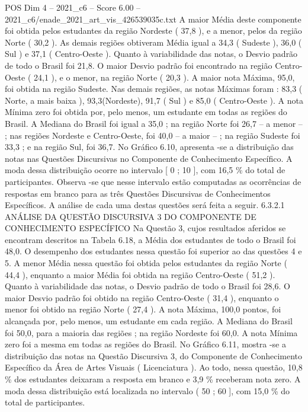 \begin{textsample}{POS Dim 4 – 2021\_c6 – Score 6.00 – 2021\_c6/enade\_2021\_art\_vis\_426539035c.txt}
A maior Média deste componente foi obtida pelos estudantes da região Nordeste ( 37,8 ), e a menor, pelos da região Norte ( 30,2 ).
As demais regiões obtiveram Média igual a 34,3 ( Sudeste ), 36,0 ( Sul ) e 37,1 ( Centro-Oeste ).
Quanto à variabilidade das notas, o Desvio padrão de todo o Brasil foi 21,8.
O maior Desvio padrão foi encontrado na região Centro-Oeste ( 24,1 ), e o menor, na região Norte ( 20,3 ).
A maior nota Máxima, 95,0, foi obtida na região Sudeste.
Nas demais regiões, as notas Máximas foram : 83,3 ( Norte, a mais baixa ), 93,3(Nordeste), 91,7 ( Sul ) e 85,0 ( Centro-Oeste ).
A nota Mínima zero foi obtida por, pelo menos, um estudante em todas as regiões do Brasil.
A Mediana do Brasil foi igual a 35,0 ; na região Norte foi 26,7 – a menor – ; nas regiões Nordeste e Centro-Oeste, foi 40,0 – a maior – ; na região Sudeste foi 33,3 ; e na região Sul, foi 36,7.
No Gráfico 6.10, apresenta -se a distribuição das notas nas Questões Discursivas no Componente de Conhecimento Específico.
A moda dessa distribuição ocorre no intervalo [ 0 ; 10 ], com 16,5 \% do total de participantes.
Observa -se que nesse intervalo estão computadas as ocorrências de respostas em branco para as três Questões Discursivas de Conhecimentos Específicos.
A análise de cada uma destas questões será feita a seguir. 6.3.2.1 ANÁLISE DA QUESTÃO DISCURSIVA 3 DO COMPONENTE DE CONHECIMENTO ESPECÍFICO Na Questão 3, cujos resultados aferidos se encontram descritos na Tabela 6.18, a Média dos estudantes de todo o Brasil foi 48,0.
O desempenho dos estudantes nessa questão foi superior ao das questões 4 e 5.
A menor Média nessa questão foi obtida pelos estudantes da região Norte ( 44,4 ), enquanto a maior Média foi obtida na região Centro-Oeste ( 51,2 ).
Quanto à variabilidade das notas, o Desvio padrão de todo o Brasil foi 28,6.
O maior Desvio padrão foi obtido na região Centro-Oeste ( 31,4 ), enquanto o menor foi obtido na região Norte ( 27,4 ).
A nota Máxima, 100,0 pontos, foi alcançada por, pelo menos, um estudante em cada região.
A Mediana do Brasil foi 50,0, para a maioria das regiões ; na região Nordeste foi 60,0.
A nota Mínima zero foi a mesma em todas as regiões do Brasil.
No Gráfico 6.11, mostra -se a distribuição das notas na Questão Discursiva 3, do Componente de Conhecimento Específico da Área de Artes Visuais ( Licenciatura ).
Ao todo, nessa questão, 10,8 \% dos estudantes deixaram a resposta em branco e 3,9 \% receberam nota zero.
A moda dessa distribuição está localizada no intervalo ( 50 ; 60 ], com 15,0 \% do total de participantes.

\end{textsample}

